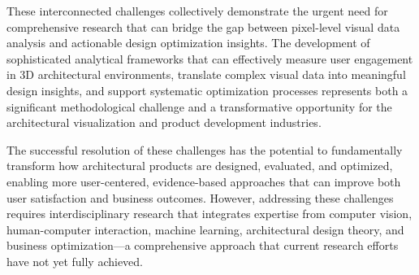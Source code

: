 These interconnected challenges collectively demonstrate the urgent need for comprehensive research that can bridge the gap between pixel-level visual data analysis and actionable design optimization insights. The development of sophisticated analytical frameworks that can effectively measure user engagement in 3D architectural environments, translate complex visual data into meaningful design insights, and support systematic optimization processes represents both a significant methodological challenge and a transformative opportunity for the architectural visualization and product development industries.

The successful resolution of these challenges has the potential to fundamentally transform how architectural products are designed, evaluated, and optimized, enabling more user-centered, evidence-based approaches that can improve both user satisfaction and business outcomes. However, addressing these challenges requires interdisciplinary research that integrates expertise from computer vision, human-computer interaction, machine learning, architectural design theory, and business optimization---a comprehensive approach that current research efforts have not yet fully achieved.